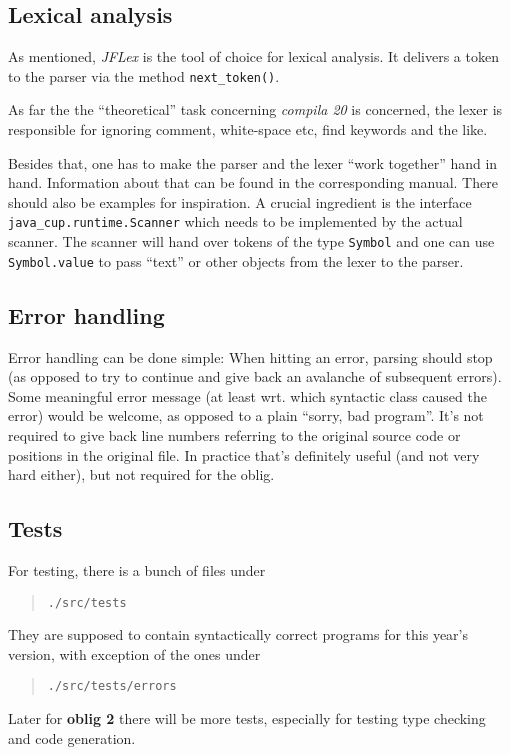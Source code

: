 \documentclass[10pt,freeform]{handout}[2014/08/13]
\begin{document}
\subsection{Lexical analysis}
\label{sec:lexical-analysis}

As mentioned, \textsl{JFLex} is the tool of choice for lexical analysis. It
delivers a token to the parser via the method \texttt{next\_token()}.  

As far the the ``theoretical'' task concerning \textsl{compila 20} is
concerned, the lexer is responsible for ignoring comment, white-space etc,
find keywords and the like.

Besides that, one has to make the parser and the lexer ``work together''
hand in hand. Information about that can be found in the corresponding
manual. There should also be examples for inspiration. A crucial ingredient
is the interface \texttt{java\_cup.runtime.Scanner} which needs to be
implemented by the actual scanner. The scanner will hand over tokens of the
type \texttt{Symbol} and one can use \texttt{Symbol.value} to pass ``text''
or other objects from the lexer to the parser.



\subsection{Error handling}
\label{sec:error-handling}

Error handling can be done simple: When hitting an error, parsing should
stop (as opposed to try to continue and give back an avalanche of
subsequent errors). Some meaningful error message (at least wrt. which
syntactic class caused the error) would be welcome, as opposed to a plain
``sorry, bad program''. It's not required to give back line numbers
referring to the original source code or positions in the original
file. In practice that's definitely useful (and not very hard either), but
not required for the oblig.




\subsection{Tests}
\label{sec:tests}

For testing, there is a bunch of files under

\begin{quote}
  \texttt{./src/tests}
\end{quote}

They are supposed to contain syntactically correct programs for this year's
version, with exception of the ones under
\begin{quote}
  \texttt{./src/tests/errors}
\end{quote}
Later for \textbf{oblig 2} there will be more tests, especially for testing
type checking and code generation. 
\end{document}
